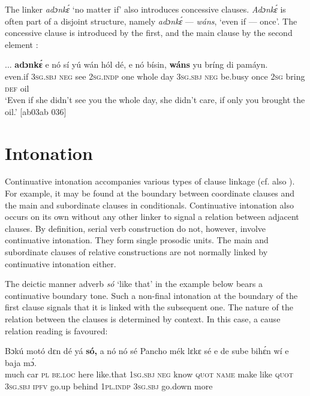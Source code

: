 The linker \textit{adɔnkɛ́} ‘no matter if’ also introduces concessive clauses. \textit{Adɔnkɛ́} is often part of a disjoint structure, namely \textit{adɔnkɛ́} — \textit{wáns}, ‘even if — once’. The concessive clause is introduced by the first, and the main clause by the second element : 


\ea%
    \label{ex:key:1537}
    \gll \op...\cp{} \textbf{adɔnkɛ́}  e    nó  sí  yú    wán  hól    dé,  e    nó  bísin,
\textbf{wáns}  yu  bríng  di  pamáyn.\\
{} even.if  \textsc{3sg.sbj}  \textsc{neg}  see  \textsc{2sg.indp}  one  whole  day  \textsc{3sg.sbj}  \textsc{neg}  be.busy
once  \textsc{2sg}  bring  \textsc{def}  oil\\

\glt ‘Even if she didn’t see you the whole day, she didn’t care, if only you 
brought the oil.’ [ab03ab 036]
\z

\section{Intonation}\label{sec:10.8}

Continuative intonation accompanies various types of clause linkage (cf. also ). For example, it may be found at the boundary between coordinate clauses and the main and subordinate clauses in conditionals. Continuative intonation also occurs on its own without any other linker to signal a relation between adjacent clauses. By definition, serial verb construction do not, however, involve continuative intonation. They form single prosodic units. The main and subordinate clauses of relative constructions are not normally linked by continuative intonation either.


The deictic manner adverb \textit{só} ‘like that’ in the example below bears a continuative boundary tone. Such a non-final intonation at the boundary of the first clause signals that it is linked with the subsequent one. The nature of the relation between the clauses is determined by context. In this case, a cause relation reading is favoured:



\ea%
    \label{ex:key:1538}
    \gll Bɔkú  motó  dɛn  dé    yá    \textbf{só,}    a    nó  nó    sé
Pancho  mék    lɛkɛ    sé    e    de  sube    bihɛ́n
wí    e    baja      mɔ́.\\
much  car    \textsc{pl}  \textsc{be.loc}  here    like.that  \textsc{1sg.sbj}  \textsc{neg}  know  \textsc{quot}
\textsc{name}  make  like    \textsc{quot}    \textsc{3sg.sbj}  \textsc{ipfv}  go.up  behind
\textsc{1pl.indp}  \textsc{3sg.sbj}  go.down    more\\

